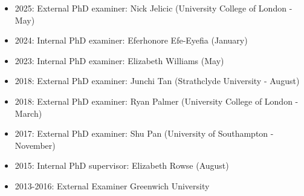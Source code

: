 \documentclass[10pt]{article}
\begin{document}
\begin{itemize}

  \item 2025: External PhD examiner: Nick Jelicic (University College of London - May)

  \item 2024: Internal PhD examiner: Eferhonore Efe-Eyefia (January)

  \item 2023: Internal PhD examiner: Elizabeth Williams (May)

  \item 2018: External PhD examiner: Junchi Tan (Strathclyde University - August)

  \item 2018: External PhD examiner: Ryan Palmer (University College of London - March)

  \item 2017: External PhD examiner: Shu Pan (University of Southampton - November)

  \item 2015: Internal PhD supervisor: Elizabeth Rowse (August)

  \item 2013-2016: External Examiner Greenwich University

\end{itemize}
\end{document}
